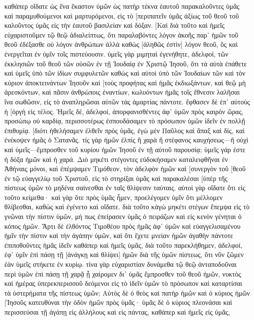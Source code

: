 καθάπερ οἴδατε ὡς ἕνα ἕκαστον ὑμῶν ὡς πατὴρ τέκνα ἑαυτοῦ 
παρακαλοῦντες ὑμᾶς καὶ παραμυθούμενοι καὶ μαρτυρόμενοι, εἰς τὸ [περιπατεῖν ὑμᾶς ἀξίως τοῦ θεοῦ τοῦ καλοῦντος ὑμᾶς εἰς τὴν ἑαυτοῦ βασιλείαν καὶ δόξαν. 
[Καὶ διὰ τοῦτο καὶ ἡμεῖς εὐχαριστοῦμεν τῷ θεῷ ἀδιαλείπτως, ὅτι παραλαβόντες λόγον ἀκοῆς παρ᾽ ἡμῶν τοῦ θεοῦ ἐδέξασθε οὐ λόγον ἀνθρώπων ἀλλὰ καθὼς [ἀληθῶς ἐστὶν] λόγον θεοῦ, ὃς καὶ ἐνεργεῖται ἐν ὑμῖν τοῖς πιστεύουσιν. 
ὑμεῖς γὰρ μιμηταὶ ἐγενήθητε, ἀδελφοί, τῶν ἐκκλησιῶν τοῦ θεοῦ τῶν οὐσῶν ἐν τῇ Ἰουδαίᾳ ἐν Χριστῷ Ἰησοῦ, ὅτι τὰ αὐτὰ ἐπάθετε καὶ ὑμεῖς ὑπὸ τῶν ἰδίων συμφυλετῶν καθὼς καὶ αὐτοὶ ὑπὸ τῶν Ἰουδαίων 
τῶν καὶ τὸν κύριον ἀποκτεινάντων Ἰησοῦν καὶ [τοὺς προφήτας καὶ ἡμᾶς ἐκδιωξάντων, καὶ θεῷ μὴ ἀρεσκόντων, καὶ πᾶσιν ἀνθρώποις ἐναντίων, 
κωλυόντων ἡμᾶς τοῖς ἔθνεσιν λαλῆσαι ἵνα σωθῶσιν, εἰς τὸ ἀναπληρῶσαι αὐτῶν τὰς ἁμαρτίας πάντοτε. ἔφθασεν δὲ ἐπ᾽ αὐτοὺς ἡ [ὀργὴ εἰς τέλος. 
Ἡμεῖς δέ, ἀδελφοί, ἀπορφανισθέντες ἀφ᾽ ὑμῶν πρὸς καιρὸν ὥρας, προσώπῳ οὐ καρδίᾳ, περισσοτέρως ἐσπουδάσαμεν τὸ πρόσωπον ὑμῶν ἰδεῖν ἐν πολλῇ ἐπιθυμίᾳ. 
[διότι ἠθελήσαμεν ἐλθεῖν πρὸς ὑμᾶς, ἐγὼ μὲν Παῦλος καὶ ἅπαξ καὶ δίς, καὶ ἐνέκοψεν ἡμᾶς ὁ Σατανᾶς. 
τίς γὰρ ἡμῶν ἐλπὶς ἢ χαρὰ ἢ στέφανος καυχήσεως—ἢ οὐχὶ καὶ ὑμεῖς—ἔμπροσθεν τοῦ κυρίου ἡμῶν Ἰησοῦ ἐν τῇ αὐτοῦ παρουσίᾳ; 
ὑμεῖς γάρ ἐστε ἡ δόξα ἡμῶν καὶ ἡ χαρά. 
Διὸ μηκέτι στέγοντες εὐδοκήσαμεν καταλειφθῆναι ἐν Ἀθήναις μόνοι, 
καὶ ἐπέμψαμεν Τιμόθεον, τὸν ἀδελφὸν ἡμῶν καὶ [συνεργὸν τοῦ [θεοῦ ἐν τῷ εὐαγγελίῳ τοῦ Χριστοῦ, εἰς τὸ στηρίξαι ὑμᾶς καὶ παρακαλέσαι [ὑπὲρ τῆς πίστεως ὑμῶν 
τὸ μηδένα σαίνεσθαι ἐν ταῖς θλίψεσιν ταύταις. αὐτοὶ γὰρ οἴδατε ὅτι εἰς τοῦτο κείμεθα· 
καὶ γὰρ ὅτε πρὸς ὑμᾶς ἦμεν, προελέγομεν ὑμῖν ὅτι μέλλομεν θλίβεσθαι, καθὼς καὶ ἐγένετο καὶ οἴδατε. 
διὰ τοῦτο κἀγὼ μηκέτι στέγων ἔπεμψα εἰς τὸ γνῶναι τὴν πίστιν ὑμῶν, μή πως ἐπείρασεν ὑμᾶς ὁ πειράζων καὶ εἰς κενὸν γένηται ὁ κόπος ἡμῶν. 
Ἄρτι δὲ ἐλθόντος Τιμοθέου πρὸς ἡμᾶς ἀφ᾽ ὑμῶν καὶ εὐαγγελισαμένου ἡμῖν τὴν πίστιν καὶ τὴν ἀγάπην ὑμῶν, καὶ ὅτι ἔχετε μνείαν ἡμῶν ἀγαθὴν πάντοτε ἐπιποθοῦντες ἡμᾶς ἰδεῖν καθάπερ καὶ ἡμεῖς ὑμᾶς, 
διὰ τοῦτο παρεκλήθημεν, ἀδελφοί, ἐφ᾽ ὑμῖν ἐπὶ πάσῃ τῇ [ἀνάγκῃ καὶ θλίψει] ἡμῶν διὰ τῆς ὑμῶν πίστεως, 
ὅτι νῦν ζῶμεν ἐὰν ὑμεῖς στήκετε ἐν κυρίῳ. 
τίνα γὰρ εὐχαριστίαν δυνάμεθα τῷ θεῷ ἀνταποδοῦναι περὶ ὑμῶν ἐπὶ πάσῃ τῇ χαρᾷ ᾗ χαίρομεν δι᾽ ὑμᾶς ἔμπροσθεν τοῦ θεοῦ ἡμῶν, 
νυκτὸς καὶ ἡμέρας ὑπερεκπερισσοῦ δεόμενοι εἰς τὸ ἰδεῖν ὑμῶν τὸ πρόσωπον καὶ καταρτίσαι τὰ ὑστερήματα τῆς πίστεως ὑμῶν; 
Αὐτὸς δὲ ὁ θεὸς καὶ πατὴρ ἡμῶν καὶ ὁ κύριος ἡμῶν [Ἰησοῦς κατευθύναι τὴν ὁδὸν ἡμῶν πρὸς ὑμᾶς· 
ὑμᾶς δὲ ὁ κύριος πλεονάσαι καὶ περισσεύσαι τῇ ἀγάπῃ εἰς ἀλλήλους καὶ εἰς πάντας, καθάπερ καὶ ἡμεῖς εἰς ὑμᾶς, 
